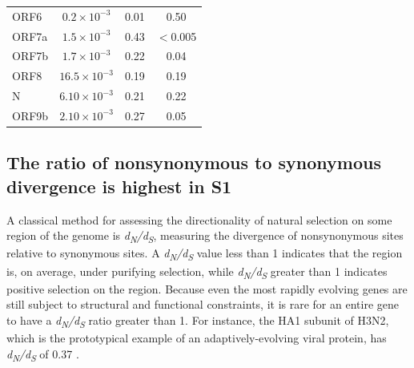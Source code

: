 \documentclass[11pt,oneside,letterpaper]{article}
\begin{document}
\begin{table}[]
\begin{center}
\begin{tabular}{lccc}
    ORF6  & $0.2 \times 10^{-3}$  & 0.01   & 0.50     \\
    ORF7a & $1.5 \times 10^{-3}$  & 0.43   & $<$0.005 \\
    ORF7b & $1.7 \times 10^{-3}$  & 0.22   & 0.04     \\
    ORF8  & $16.5 \times 10^{-3}$ & 0.19   & 0.19     \\
    N     & $6.10 \times 10^{-3}$ & 0.21   & 0.22     \\
    ORF9b & $2.10 \times 10^{-3}$ & 0.27   & 0.05     \\
    \hline
    \end{tabular}
    \label{tab:table1}
    \end{center}
\end{table}

\subsection*{The ratio of nonsynonymous to synonymous divergence is highest in S1}
A classical method for assessing the directionality of natural selection on some region of the genome is \emph{d\textsubscript{N}/d\textsubscript{S}}, measuring the divergence of nonsynonymous sites relative to synonymous sites. A \emph{d\textsubscript{N}/d\textsubscript{S}} value less than 1 indicates that the region is, on average, under purifying selection, while \emph{d\textsubscript{N}/d\textsubscript{S}} greater than 1 indicates positive selection on the region. Because even the most rapidly evolving genes are still subject to structural and functional constraints, it is rare for an entire gene to have a \emph{d\textsubscript{N}/d\textsubscript{S}} ratio greater than 1. For instance, the HA1 subunit of H3N2, which is the prototypical example of an adaptively-evolving viral protein, has \emph{d\textsubscript{N}/d\textsubscript{S}} of 0.37 \cite{Wolf2006-vy}.
\end{document}

